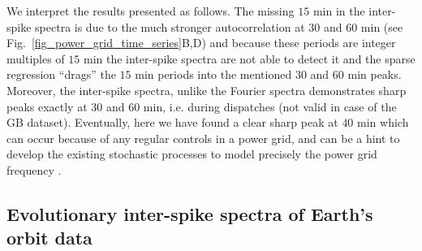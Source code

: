 \documentclass[entropy,article,submit,pdftex,moreauthors]{Definitions/mdpi}
\begin{document}
We interpret the results presented as follows. The missing $15$ \si{min} in the inter-spike spectra is due to the much stronger autocorrelation at $30$ and $60$ \si{min} 
(see Fig.~\ref{fig_power_grid_time_series}B,D) and because these periods are integer multiples of $15$ \si{min} the inter-spike spectra are not able to detect it and the 
sparse regression ``drags'' the $15$ \si{min} periods into the mentioned $30$ and $60$ \si{min} peaks. Moreover, the inter-spike spectra, unlike the Fourier spectra demonstrates sharp peaks exactly 
at $30$ and $60$ \si{min}, i.e. during dispatches (not valid in case of the GB dataset). Eventually, here we have found a clear sharp peak at $40$ \si{min} which can occur 
because of any regular controls in a power grid, and can be a hint to develop the existing stochastic processes to model precisely the power grid frequency \cite{gorjao2020data}. 



\subsection{Evolutionary inter-spike spectra of Earth's orbit data}
\end{document}
